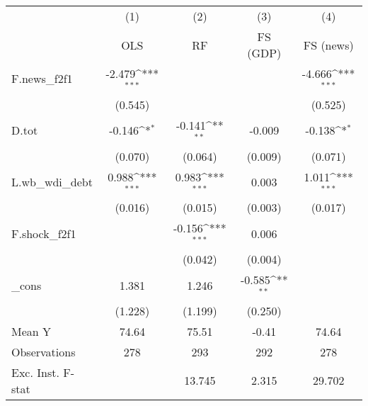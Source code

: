 {
\def\sym#1{\ifmmode^{#1}\else\(^{#1}\)\fi}
\begin{tabular}{l*{4}{c}}
\toprule
            &\multicolumn{1}{c}{(1)}&\multicolumn{1}{c}{(2)}&\multicolumn{1}{c}{(3)}&\multicolumn{1}{c}{(4)}\\
            &\multicolumn{1}{c}{OLS}&\multicolumn{1}{c}{RF}&\multicolumn{1}{c}{FS (GDP)}&\multicolumn{1}{c}{FS (news)}\\
\midrule
F.news\_f2f1 &      -2.479\sym{***}&                     &                     &      -4.666\sym{***}\\
            &     (0.545)         &                     &                     &     (0.525)         \\
\addlinespace
D.tot       &      -0.146\sym{*}  &      -0.141\sym{**} &      -0.009         &      -0.138\sym{*}  \\
            &     (0.070)         &     (0.064)         &     (0.009)         &     (0.071)         \\
\addlinespace
L.wb\_wdi\_debt&       0.988\sym{***}&       0.983\sym{***}&       0.003         &       1.011\sym{***}\\
            &     (0.016)         &     (0.015)         &     (0.003)         &     (0.017)         \\
\addlinespace
F.shock\_f2f1&                     &      -0.156\sym{***}&       0.006         &                     \\
            &                     &     (0.042)         &     (0.004)         &                     \\
\addlinespace
\_cons      &       1.381         &       1.246         &      -0.585\sym{**} &                     \\
            &     (1.228)         &     (1.199)         &     (0.250)         &                     \\
\midrule
Mean Y      &       74.64         &       75.51         &       -0.41         &       74.64         \\
Observations&         278         &         293         &         292         &         278         \\
Exc. Inst. F-stat&                     &      13.745         &       2.315         &      29.702         \\
\bottomrule
\end{tabular}
}
